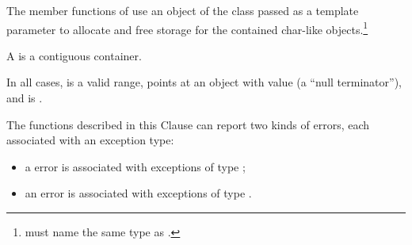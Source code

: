 \pnum
The
member functions of
 use an object of the
class passed as a template parameter to allocate and free storage for the
contained char-like objects.\footnote{ must name the same type
as .}

\pnum
A  is a contiguous container.

\pnum
In all cases,
 is a valid range,
 points at an object with value 
(a ``null terminator''),
and  is .

\pnum
The functions described in this Clause can report two
kinds of errors, each associated with an exception type:

\begin{itemize}
\item
a
error is associated with exceptions of type
;
%
\item
an
error is associated with exceptions of type
.
%
\end{itemize}


